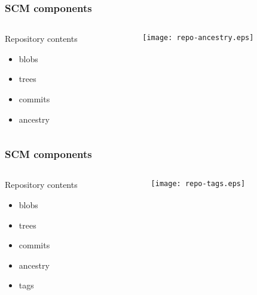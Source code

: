 \documentclass[english]{beamer}
\begin{document}
\begin{frame}
\frametitle{SCM components}
\begin{columns}[t]
        \begin{column}{.5\textwidth}
                Repository contents
                \begin{itemize}
                        \item blobs
                        \item trees
                        \item commits
                        \item ancestry
                \end{itemize}
        \end{column}
        \begin{column}[T]{.5\textwidth}
                \vspace{.2\textheight}
                \texttt{[image: repo-ancestry.eps]}
        \end{column}
\end{columns}

\end{frame}

\begin{frame}
\frametitle{SCM components}
\begin{columns}[t]
        \begin{column}{.5\textwidth}
                Repository contents
                \begin{itemize}
                        \item blobs
                        \item trees
                        \item commits
                        \item ancestry
                        \item tags
                \end{itemize}
        \end{column}
        \begin{column}[T]{.5\textwidth}
                \vspace{.2\textheight}
                \texttt{[image: repo-tags.eps]}
        \end{column}
\end{columns}

\end{frame}
\end{document}
